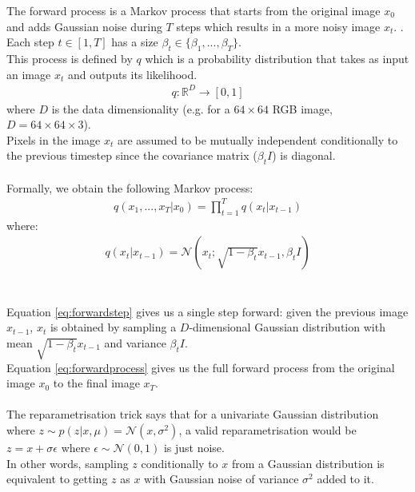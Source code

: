 \documentclass[twoside]{article}
\numberwithin{equation}{section}
\numberwithin{figure}{section}
\begin{document}
The forward process is a Markov process that starts from the original image $x_0$ and adds Gaussian noise during $T$ steps which results in a more noisy image $x_t$. \cite{ho2020denoising}. \\
Each step $t \in \left[1, T\right]$ has a size $\beta_t \in \{ \beta_1, ..., \beta_T \}$. \\ 
This process is defined by $q$ which is a probability distribution that takes as input an image $x_{t}$ and outputs its likelihood.
\begin{align}
  q: \mathbb{R}^D \rightarrow [0, 1]
\end{align}
where $D$ is the data dimensionality (e.g. for a $64 \times 64$ RGB image, $D = 64 \times 64 \times 3$). \\
Pixels in the image $x_t$ are assumed to be mutually independent conditionally to the previous timestep since the covariance matrix ($\beta_t I$) is diagonal.
\\\\
Formally, we obtain the following Markov process:
\begin{align}
  q\left(x_{1},..., x_{T} | x_0\right) = \prod_{t = 1}^T{q\left(x_t | x_{t - 1}\right)} \label{eq:forwardprocess}
\end{align}
where:
\begin{align}
  q\left(x_t | x_{t-1}\right) = \mathcal{N}\left(x_t; \sqrt{1 - \beta_t}x_{t-1}, \beta_t I\right) \label{eq:forwardstep}
\end{align}
\\\\
Equation \ref{eq:forwardstep} gives us a single step forward: given the previous image $x_{t-1}$, $x_t$ is obtained by sampling a $D$-dimensional Gaussian distribution with mean $\sqrt{1 - \beta_t}x_{t-1}$ and variance $\beta_t I$. \\
Equation \ref{eq:forwardprocess} gives us the full forward process from the original image $x_0$ to the final image $x_T$.
\\\\
The reparametrisation trick says that for a univariate Gaussian distribution where $z \sim p\left(z | x, \mu \right) = \mathcal{N}\left(x, \sigma^2\right)$, a valid reparametrisation would be $z = x + \sigma \epsilon$ where $\epsilon \sim \mathcal{N}\left(0, 1\right)$ is just noise. \cite{kingma2022autoencoding} \\
In other words, sampling $z$ conditionally to $x$ from a Gaussian distribution is equivalent to getting $z$ as $x$ with Gaussian noise of variance $\sigma^2$ added to it.
\end{document}
